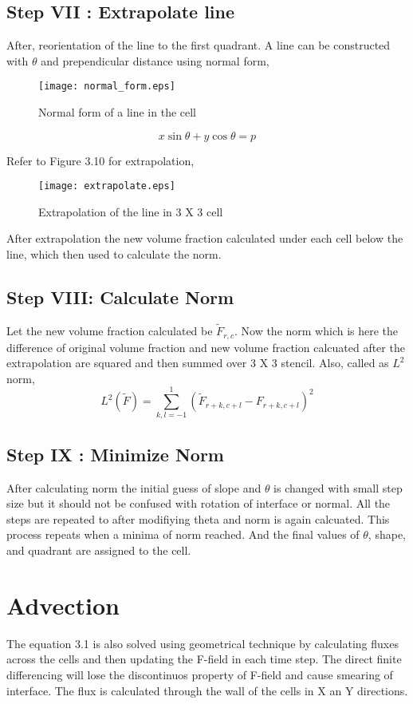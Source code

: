 \subsection{Step VII : Extrapolate line}
After, reorientation of the line to the first quadrant. A line can be constructed with $\theta$ and prependicular distance using normal form,
\begin{figure}[H]
 \centering
 \texttt{[image: normal\_form.eps]}
 \caption{Normal form of a line in the cell}
\end{figure}
\begin{equation}
 x\sin\theta+y\cos\theta = p
\end{equation}

Refer to Figure 3.10 for extrapolation,

\begin{figure}[H]
 \centering
 \texttt{[image: extrapolate.eps]}
 \caption{Extrapolation of the line in 3 X 3 cell}
\end{figure}

After extrapolation the new volume fraction calculated under each cell below the line, which then used to calculate the norm.
\subsection{Step VIII: Calculate Norm}
Let the new volume fraction calculated be $\widetilde F_{r,c}$. Now the norm which is here the difference of original volume fraction and new 
volume fraction calcuated after the extrapolation are squared and then summed over 3 X 3 stencil. Also, called as $L^2$ norm, \\
\begin{equation}
 L^2(\widetilde F) =  \sum_{k,l=-1}^{1}(\widetilde F_{r+k,c+l}-F_{r+k,c+l})^2
\end{equation}

\subsection{Step IX : Minimize Norm}
After calculating norm the initial guess of slope and $\theta$ is changed with small step size but it should not be confused with rotation of interface or normal.
All the steps are repeated to after modifiying theta and norm is again calcuated. This process repeats when a minima of norm reached. And the final values of $\theta$,
shape, and quadrant are assigned to the cell.

\section{Advection}
The equation 3.1 is also solved using geometrical technique by calculating fluxes across the cells and then updating the F-field in each time step. The direct finite differencing
will lose the discontinuos property of F-field and cause smearing of interface.
The flux is calculated through the wall of the cells in X an Y directions.

